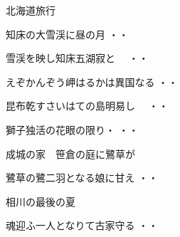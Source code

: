 \vspace{0.6cm}
北海道旅行
\begin{shiika}知床の大雪渓に昼の月
\hfill{・・}\end{shiika}
\begin{shiika}雪渓を映し知床五湖寂と　
\hfill{・・}\end{shiika}
\begin{shiika}えぞかんぞう岬はるかは異国なる
\hfill{・・}\end{shiika}
\begin{shiika}昆布乾すさいはての島明易し　
\hfill{・・}\end{shiika}
\begin{shiika}獅子独活の花眼の限り・
\hfill{・・}\end{shiika}
\vspace{0.6cm}
成城の家　笹倉の庭に鷺草が
\begin{shiika}鷺草の鷺二羽となる娘に甘え
\hfill{・・}\end{shiika}
\vspace{0.6cm}
相川の最後の夏
\begin{shiika}魂迎ふ一人となりて古家守る
\hfill{・・}\end{shiika}
\vspace{0.6cm}
\endinput
\begin{shiika}手ごなしで土をかぶせる秋の種
\hfill{\rensuji*{57}・\rensuji*{0}・\rensuji*{0}}\end{shiika}
\vspace{0.6cm}
\begin{shiika}豪雷にいさかふ妹弟抱き合ふ
\hfill{\rensuji*{57}・\rensuji*{0}・\rensuji*{0}}\end{shiika}
\vspace{0.6cm}
\begin{shiika}亡娘ノート\Kana{紙,魚}{し,み}生きている悲しさよ
\hfill{\rensuji*{57}・\rensuji*{0}・\rensuji*{0}}\end{shiika}
\vspace{0.6cm}

